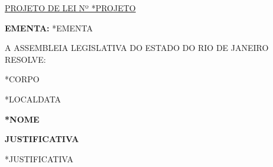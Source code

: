 \documentclass[10pt]{article}
\date{}
\begin{document}
\maketitle
\begin{center}
  \huge
  \vspace{-3cm}\href{*URL}{PROJETO DE LEI Nº *PROJETO}
\bigskip
\bigskip
\bigskip
  
\end{center}

\textbf{EMENTA:} *EMENTA

\bigskip

\noindent
A ASSEMBLEIA LEGISLATIVA DO ESTADO DO RIO DE JANEIRO RESOLVE:

\begin{enumerate}[label=Art. \arabic*\textdegree]
*CORPO
\end{enumerate}




\begin{center}
  *LOCALDATA

   \bigskip

  \textbf{*NOME}

  \bigskip

  \textbf{JUSTIFICATIVA}
  \bigskip

\end{center}

  *JUSTIFICATIVA

\iffalse
\begin{center}
  \textbf{REFERÊNCIAS}
\end{center}

*REFERÊNCIAS
\fi
\end{document}
